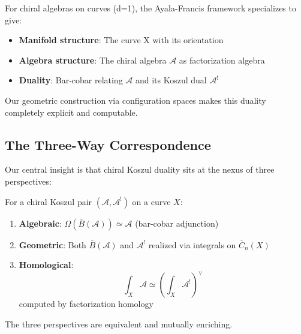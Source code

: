 \begin{remark}\label{rem:why-NAP-unifies}
For chiral algebras on curves (d=1), the Ayala-Francis framework specializes to give:

\begin{itemize}
\item \textbf{Manifold structure}: The curve X with its orientation
\item \textbf{Algebra structure}: The chiral algebra $\mathcal{A}$ as factorization algebra
\item \textbf{Duality}: Bar-cobar relating $\mathcal{A}$ and its Koszul dual $\mathcal{A}^!$
\end{itemize}

Our geometric construction via configuration spaces makes this duality completely explicit and computable.
\end{remark}

\subsection{The Three-Way Correspondence}

Our central insight is that chiral Koszul duality sits at the nexus of three perspectives:

\begin{center}
\end{center}

\begin{theorem}
\label{thm:three-way-correspondence}
For a chiral Koszul pair $(\mathcal{A}, \mathcal{A}^!)$ on a curve $X$:
\begin{enumerate}
\item \textbf{Algebraic}: $\Omega(\bar{B}(\mathcal{A})) \simeq \mathcal{A}$ (bar-cobar adjunction)
\item \textbf{Geometric}: Both $\bar{B}(\mathcal{A})$ and $\mathcal{A}^!$ realized via integrals on $\overline{C}_n(X)$
\item \textbf{Homological}: 
\begin{equation}
\int_X \mathcal{A} \simeq \left(\int_X \mathcal{A}^!\right)^\vee
\end{equation}
computed by factorization homology
\end{enumerate}
The three perspectives are equivalent and mutually enriching.
\end{theorem}

